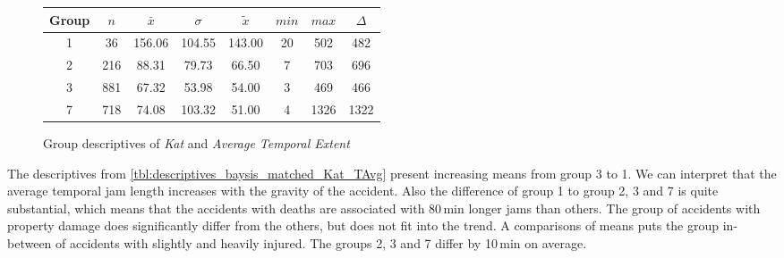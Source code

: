 \begin{figure}[ht!]
	\centering
	\begin{minipage}{0.5\textwidth}
		\tiny
		\setlength{\tabcolsep}{4pt}
		\centering
		\begin{tabular}{c|c|c|c|c|c|c|c}
			\toprule
			Group & $n$ & $\bar{x}$ & $\sigma$ & $\tilde{x}$ & $min$ & $max$ & $\Delta$ \\
			\midrule
			1 & 36  & 156.06 & 104.55 & 143.00 & 20 & 502  & 482  \\ 
			2 & 216 & 88.31  & 79.73  & 66.50  & 7  & 703  & 696  \\ 
			3 & 881 & 67.32  & 53.98  & 54.00  & 3  & 469  & 466  \\ 
			7 & 718 & 74.08  & 103.32 & 51.00  & 4  & 1326 & 1322 \\ 
			\bottomrule
		\end{tabular}
		\label{tbl:descriptives_baysis_matched_Kat_TAvg}
	\end{minipage}%
	\begin{minipage}{0.55\textwidth}
		\tiny
		\centering
		\vfill
		\label{fig:descriptives_baysis_matched_Kat_TAvg}
	\end{minipage}%
	\caption{Group descriptives of  \textit{Kat} and \textit{Average Temporal Extent}}
\end{figure}
The descriptives from \cref{tbl:descriptives_baysis_matched_Kat_TAvg} present increasing means from group 3 to 1. We can interpret that the average temporal jam length increases with the gravity of the accident. Also the difference of group 1 to group 2, 3 and 7 is quite substantial, which means that the accidents with deaths are associated with 80\,min longer jams than others. The group of accidents with property damage does significantly differ from the others, but does not fit into the trend. A comparisons of means puts the group in-between of accidents with slightly and heavily injured. The groups 2, 3 and 7 differ by 10\,min on average. 

